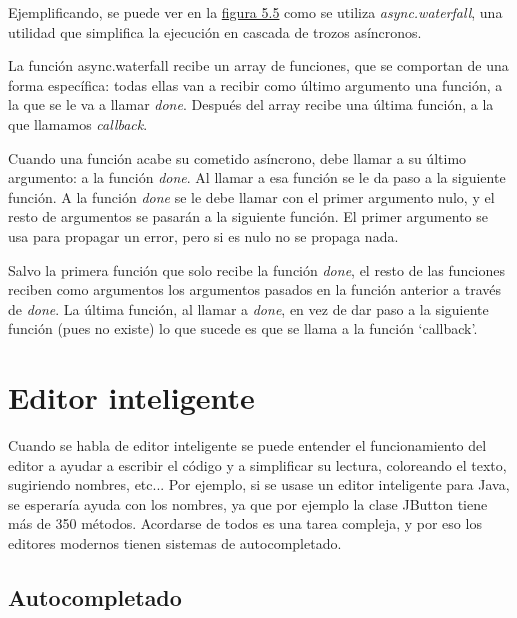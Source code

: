 \documentclass{report}
\begin{document}
	 Ejemplificando, se puede ver en la \hyperref[fig:asincrono]{figura 5.5} como se utiliza \textit{async.waterfall}, una utilidad\cite{async} que simplifica la ejecución en cascada de trozos asíncronos.
	 
	 \vspace{10px}
	 
	 La función async.waterfall recibe un array de funciones, que se comportan de una forma específica: todas ellas van a recibir como último argumento una función, a la que se le va a llamar \textit{done}. Después del array recibe una última función, a la que llamamos \textit{callback}.
	 
	 \vspace{10px}
	 
	 Cuando una función acabe su cometido asíncrono, debe llamar a su último argumento: a la función \textit{done}. Al llamar a esa función se le da paso a la siguiente función. A la función \textit{done} se le debe llamar con el primer argumento nulo, y el resto de argumentos se pasarán a la siguiente función. El primer argumento se usa para propagar un error, pero si es nulo no se propaga nada.   
	 
	 \vspace{10px}
	 
	 Salvo la primera función que solo recibe la función \textit{done}, el resto de las funciones reciben como argumentos los argumentos pasados en la función anterior a través de \textit{done}. La última función, al llamar a \textit{done}, en vez de dar paso a la siguiente función (pues no existe) lo que sucede es que se llama a la función `callback'.
	
	\section{Editor inteligente}
	
	Cuando se habla de editor inteligente se puede entender el funcionamiento del editor a ayudar a escribir el código y a simplificar su lectura, coloreando el texto, sugiriendo nombres, etc... Por ejemplo, si se usase un editor inteligente para Java, se esperaría ayuda con los nombres, ya que por ejemplo la clase JButton tiene más de 350 métodos. Acordarse de todos es una tarea compleja, y por eso los editores modernos tienen sistemas de autocompletado. 
	
	\vspace{10px}
	
	\subsection{Autocompletado}
	
\end{document}
